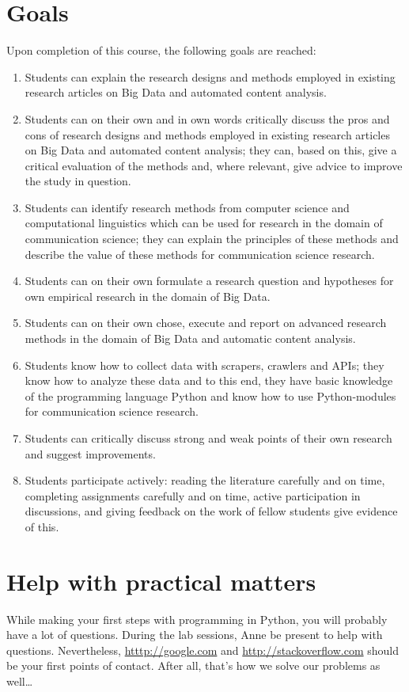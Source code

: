 \documentclass[a4paper,10pt]{report}
\begin{document}
\section{Goals}
Upon completion of this course, the following goals are reached:
\begin{enumerate}[A]
\item Students can explain the research designs and methods employed in existing research articles on Big Data and automated content analysis.
\item Students can on their own and in own words critically discuss the pros and cons of research designs and methods employed in existing research articles on Big Data and automated content analysis; they can, based on this, give a critical evaluation of the methods and, where relevant, give advice to improve the study in question.
\item Students can identify research methods from computer science and computational linguistics which can be used for research in the domain of communication science; they can explain the principles of these methods and describe the value of these methods for communication science research.
\item Students can on their own formulate a research question and hypotheses for own empirical research in the domain of Big Data.
\item Students can on their own chose, execute and report on advanced research methods in the domain of Big Data and automatic content analysis.
\item Students know how to collect data with scrapers, crawlers and APIs; they know how to analyze these data and to this end, they have basic knowledge of the programming language Python and know how to use Python-modules for communication science research.
\item Students can critically discuss  strong and weak points of their own research and suggest improvements.
\item Students participate actively: reading the literature carefully and on time, completing assignments carefully and on time, active participation in discussions, and giving feedback on the work of fellow students give evidence of this.
\end{enumerate}

\section{Help with practical matters}
While making your first steps with programming in Python, you will probably have a lot of questions. During the lab sessions, Anne be present to help with questions. 
Nevertheless, \url{htttp://google.com} and \url{http://stackoverflow.com} should be your first points of contact. After all, that's how we solve our problems as well\ldots
\end{document}

